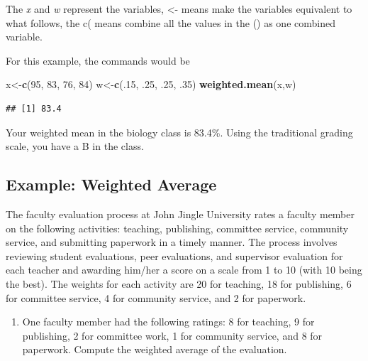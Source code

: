 \documentclass[
]{book}
\newenvironment{Shaded}{\begin{snugshade}}{\end{snugshade}}
\newcommand{\DecValTok}[1]{\textcolor[rgb]{0.00,0.00,0.81}{#1}}
\newcommand{\FloatTok}[1]{\textcolor[rgb]{0.00,0.00,0.81}{#1}}
\newcommand{\KeywordTok}[1]{\textcolor[rgb]{0.13,0.29,0.53}{\textbf{#1}}}
\newcommand{\NormalTok}[1]{#1}
\providecommand{\tightlist}{%
  \setlength{\itemsep}{0pt}\setlength{\parskip}{0pt}}
\begin{document}
The \emph{x} and \emph{w} represent the variables, \textless- means make the variables equivalent to what follows, the c( means combine all the values in the () as one combined variable.

For this example, the commands would be

\begin{Shaded}
\begin{Highlighting}[]
\NormalTok{x<-}\KeywordTok{c}\NormalTok{(}\DecValTok{95}\NormalTok{, }\DecValTok{83}\NormalTok{, }\DecValTok{76}\NormalTok{, }\DecValTok{84}\NormalTok{)}
\NormalTok{w<-}\KeywordTok{c}\NormalTok{(.}\DecValTok{15}\NormalTok{, }\FloatTok{.25}\NormalTok{, }\FloatTok{.25}\NormalTok{, }\FloatTok{.35}\NormalTok{)}
\KeywordTok{weighted.mean}\NormalTok{(x,w)}
\end{Highlighting}
\end{Shaded}

\begin{verbatim}
## [1] 83.4
\end{verbatim}

Your weighted mean in the biology class is 83.4\%. Using the traditional grading scale, you have a B in the class.

\hypertarget{example-weighted-average-1}{%
\subsection{Example: Weighted Average}\label{example-weighted-average-1}}

The faculty evaluation process at John Jingle University rates a faculty member on the following activities: teaching, publishing, committee service, community service, and submitting paperwork in a timely manner. The process involves reviewing student evaluations, peer evaluations, and supervisor evaluation for each teacher and awarding him/her a score on a scale from 1 to 10 (with 10 being the best). The weights for each activity are 20 for teaching, 18 for publishing, 6 for committee service, 4 for community service, and 2 for paperwork.

\begin{enumerate}
\def\labelenumi{\alph{enumi})}
\tightlist
\item
  One faculty member had the following ratings: 8 for teaching, 9 for publishing, 2 for committee work, 1 for community service, and 8 for paperwork. Compute the weighted average of the evaluation.
\end{enumerate}
\end{document}
